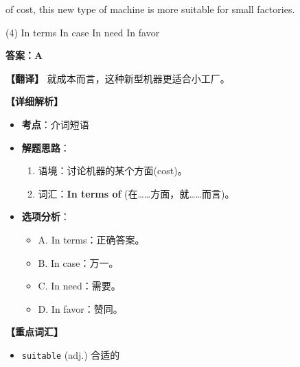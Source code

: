\documentclass[11pt, a4paper]{article}
\newcommand{\analysis}[4]{
    \begin{solutionbox}
        \textbf{答案：#1}
        
        \textbf{【翻译】} #2
        
        \textbf{【详细解析】}
        #3
        
        \textbf{【重点词汇】}
        #4
    \end{solutionbox}
}
\newcommand{\blank}{\underline{\hspace{1.5cm}}}
\begin{document}
\begin{questions}
    \item \blank of cost, this new type of machine is more suitable for small factories.
    \begin{tasks}(4)
        \task In terms \task In case \task In need \task In favor
    \end{tasks}
    \analysis{A}{就成本而言，这种新型机器更适合小工厂。}{
        \begin{itemize}
            \item \textbf{考点}：介词短语
            \item \textbf{解题思路}：
                \begin{enumerate}
                    \item 语境：讨论机器的某个方面(cost)。
                    \item 词汇：\textbf{In terms of} (在……方面，就……而言)。
                \end{enumerate}
            \item \textbf{选项分析}：
                \begin{itemize}
                    \item A. In terms：正确答案。
                    \item B. In case：万一。
                    \item C. In need：需要。
                    \item D. In favor：赞同。
                \end{itemize}
        \end{itemize}
    }{
        \begin{itemize}
            \item \texttt{suitable} (adj.) 合适的
        \end{itemize}
    }


\end{questions}
\end{document}
